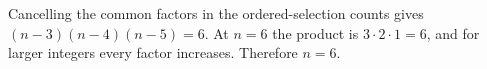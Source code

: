 Cancelling the common factors in the ordered-selection counts gives $(n-3)(n-4)(n-5)=6$. At $n=6$ the product is $3\cdot2\cdot1=6$, and for larger integers every factor increases. Therefore $\boxed{n=6}$.
